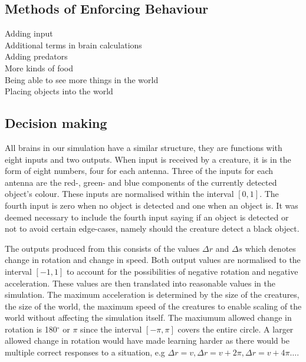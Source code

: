 \documentclass[a4paper,11pt]{kth-mag}
\begin{document}
\subsection{Methods of Enforcing Behaviour}
Adding input\\
Additional terms in brain calculations\\
Adding predators\\
More kinds of food\\
Being able to see more things in the world\\
Placing objects into the world\\
\subsection{Decision making}
All brains in our simulation have a similar structure, they are functions with eight inputs and two outputs. When input is received by a creature, it is in the form of eight numbers, four for each antenna. Three of the inputs for each antenna are the red-, green- and blue components of the currently detected object's colour. These inputs are normalised within the interval $[0,1]$. The fourth input is zero when no object is detected and one when an object is. It was deemed necessary to include the fourth input saying if an object is detected or not to avoid certain edge-cases, namely should the creature detect a black object.

The outputs produced from this consists of the values $\Delta r$ and $\Delta s$ which denotes change in rotation and change in speed. Both output values are normalised to the interval $[-1,1]$ to account for the possibilities of negative rotation and negative acceleration. These values are then translated into reasonable values in the simulation. The maximum acceleration is determined by the size of the creatures, the size of the world, the maximum speed of the creatures to enable scaling of the world without affecting the simulation itself. The maxiumum allowed change in rotation is 180$^\circ$ or $\pi$ since the interval $[-\pi,\pi]$ covers the entire circle. A larger allowed change in rotation would have made learning harder as there would be multiple correct responses to a situation, e.g $\Delta r = v, \Delta r = v+ 2\pi, \Delta r = v+ 4\pi \dots $.
\end{document}
